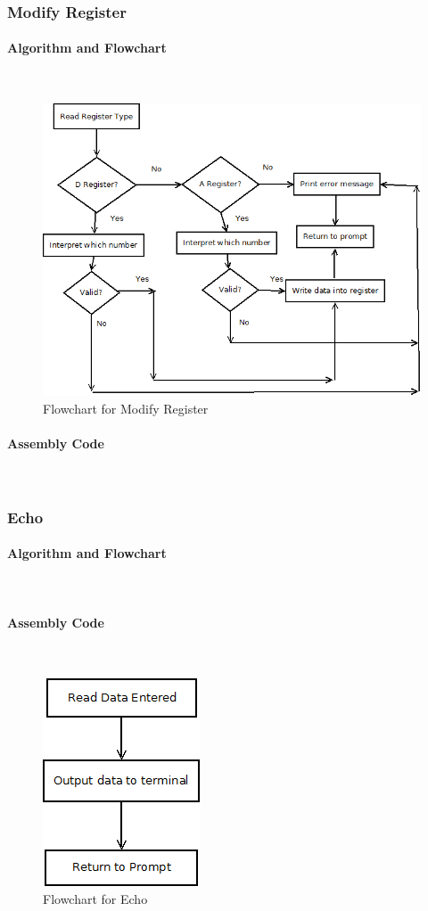 \documentclass[12pt]{article}
\begin{document}
			\subsubsection{Modify Register}
			\paragraph{Algorithm and Flowchart}~\\
			
			
			
\begin{figure}[H]
\centering
\includegraphics[width=0.7\linewidth]{ModifyReg}
\caption{Flowchart for Modify Register}
\label{fig:ModifyReg}
\end{figure}
			\paragraph{Assembly Code}~\\				%
			
			\subsubsection{Echo}
			\paragraph{Algorithm and Flowchart}~\\
			\paragraph{Assembly Code}~\\				%
		
			
\begin{figure}[H]
\centering
\includegraphics[width=0.3\linewidth]{Echo}
\caption{Flowchart for Echo}
\label{fig:Echo}
\end{figure}
			
\end{document}
